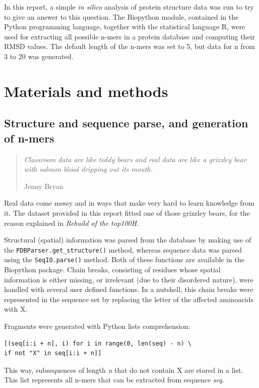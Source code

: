\documentclass[a4paper, 11pt]{article} %
\begin{document}
In this report, a simple \textit{in silico} analysis of protein structure data was run to try to give an answer to this question. The Biopython module, contained in the Python programming language, together with the statistical language R, were used for extracting all possible n-mers in a protein database and computing their RMSD values. The default length of the n-mers was set to 5, but data for n from 3 to 20 was generated.


\section{Materials and methods}


\subsection{Structure and sequence parse, and generation of n-mers}


\begin{quote}
\textit{Classroom data are like teddy bears and real data are like a 
grizzley bear with salmon blood dripping out its mouth.}

\hfill Jenny Bryan
\end{quote}

Real data come messy and in ways that make very hard to learn knowledge from it. The dataset provided in this report fitted one of those grizzley bears, for the reason explained in \textit{Rebuild of the top100H}.
 
Structural (spatial) information was parsed from the database by making use of the \texttt{PDBParser.get\_structure()} method, whereas sequence data was parsed using the \texttt{SeqIO.parse()}  method. Both of these functions are available in the Biopython package. Chain breaks, consisting of residues whose spatial information is either missing, or irrelevant (due to their disordered nature), were handled with several user defined functions. In a nutshell, this chain breaks were represented in the sequence set by replacing the letter of the affected aminoacids with X.

Fragments were generated with Python list\textquotesingle s comprehension:

\begin{verbatim}
[(seq[i:i + n], i) for i in range(0, len(seq) - n) \
if not "X" in seq[i:i + n]]
\end{verbatim}

This way, subsequences of length \textit{n} that do not contain X are stored in a list. This list represents all n-mers that can be extracted from sequence \textit{seq}.
\end{document}
